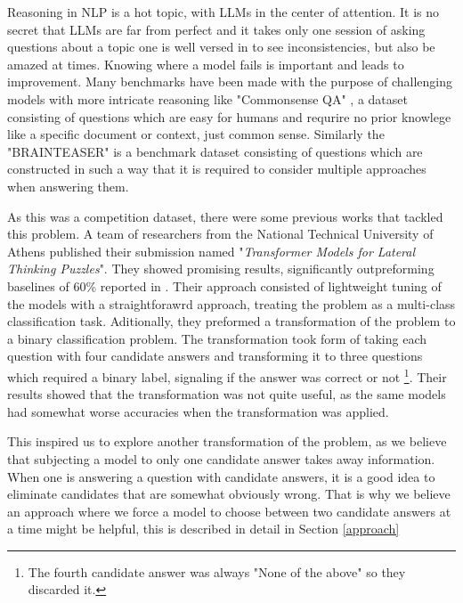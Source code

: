 Reasoning in NLP is a hot topic, with LLMs in the center of attention.  It is no secret that 
LLMs are far from perfect and it takes only one session of asking questions about a
topic one is well versed in to see inconsistencies, but also be amazed at times.  Knowing where
a model fails is important and leads to improvement.  Many benchmarks have been made with the
purpose of challenging models with more intricate reasoning like "Commonsense QA"
\citep{commonsenseQA}, a dataset consisting of questions which are easy for humans and requrire
no prior knowlege like a specific document or context, just common sense.  Similarly the "BRAINTEASER"
\citep{semeval} is a benchmark dataset consisting of questions which are constructed
in such a way that it is required to consider multiple approaches when answering them.

As this was a competition dataset, there were some previous works that tackled this problem. 
A team of researchers from the National Technical University of Athens published their submission
\citep{ails-lab} named "\textit{Transformer Models for Lateral Thinking Puzzles}".  They showed promising
results, significantly outpreforming baselines of 60\% reported in \citep{semeval}. Their approach consisted
of lightweight tuning of the models with a straightforawrd approach, treating the problem as a
multi-class classification task.  Aditionally, they preformed a 
transformation of the problem to a binary classification problem.  The transformation took form of
taking each question with four candidate answers and transforming it to three questions which 
required a binary label, signaling if the answer was correct or not \footnote[2]{The fourth candidate
answer was always "None of the above" so they discarded it.}. Their results showed that the 
transformation was not quite useful, as the same models had somewhat worse accuracies when
the transformation was applied.  

This inspired us to explore another transformation of the problem, as we believe that subjecting
a model to only one candidate answer takes away information.  When one is answering a question
with candidate answers, it is a good idea to eliminate candidates that are somewhat obviously wrong.
That is why we believe an approach where we force a model to choose between two candidate answers
at a time might be helpful, this is described in detail in Section \ref{approach}

